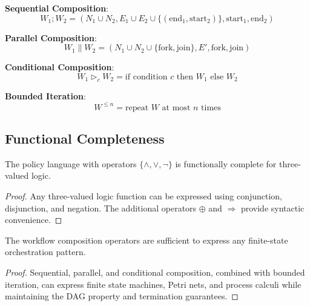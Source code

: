 \textbf{Sequential Composition}:
\begin{equation}
W_1 ; W_2 = (N_1 \cup N_2, E_1 \cup E_2 \cup \{(\text{end}_1, \text{start}_2)\}, \text{start}_1, \text{end}_2)
\end{equation}

\textbf{Parallel Composition}:
\begin{equation}
W_1 \parallel W_2 = (N_1 \cup N_2 \cup \{\text{fork}, \text{join}\}, E', \text{fork}, \text{join})
\end{equation}

\textbf{Conditional Composition}:
\begin{equation}
W_1 \triangleright_c W_2 = \text{if condition } c \text{ then } W_1 \text{ else } W_2
\end{equation}

\textbf{Bounded Iteration}:
\begin{equation}
W^{\leq n} = \text{repeat } W \text{ at most } n \text{ times}
\end{equation}

\subsection{Functional Completeness}

\begin{theorem}
\label{thm:functional-completeness}
The policy language with operators $\{\land, \lor, \neg\}$ is functionally complete for three-valued logic.
\end{theorem}

\begin{proof}
Any three-valued logic function can be expressed using conjunction, disjunction, and negation. The additional operators $\oplus$ and $\Rightarrow$ provide syntactic convenience.
\end{proof}

\begin{theorem}
\label{thm:workflow-completeness}
The workflow composition operators are sufficient to express any finite-state orchestration pattern.
\end{theorem}

\begin{proof}
Sequential, parallel, and conditional composition, combined with bounded iteration, can express finite state machines, Petri nets, and process calculi while maintaining the DAG property and termination guarantees.
\end{proof}

